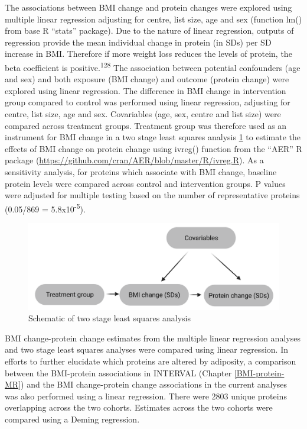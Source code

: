 \documentclass[11pt,twoside]{bristolthesis}
\begin{document}
The associations between BMI change and protein changes were explored using multiple linear regression adjusting for centre, list size, age and sex (function lm() from base R ``stats'' package). Due to the nature of linear regression, outputs of regression provide the mean individual change in protein (in SDs) per SD increase in BMI. Therefore if more weight loss reduces the levels of protein, the beta coefficient is positive.\textsuperscript{128} The association between potential confounders (age and sex) and both exposure (BMI change) and outcome (protein change) were explored using linear regression. The difference in BMI change in intervention group compared to control was performed using linear regression, adjusting for centre, list size, age and sex. Covariables (age, sex, centre and list size) were compared across treatment groups. Treatment group was therefore used as an instrument for BMI change in a two stage least squares analysis \ref{fig:direct-tsls} to estimate the effects of BMI change on protein change using ivreg() function from the ``AER'' R package (\url{https://github.com/cran/AER/blob/master/R/ivreg.R}). As a sensitivity analysis, for proteins which associate with BMI change, baseline protein levels were compared across control and intervention groups. P values were adjusted for multiple testing based on the number of representative proteins (0.05/869 = 5.8x10\textsuperscript{-5}).



\begin{figure}
\includegraphics{figure/DiRECT/DiRECT_analysis} \caption[Schematic of two stage least squares analysis]{Schematic of two stage least squares analysis}\label{fig:direct-tsls}
\end{figure}
BMI change-protein change estimates from the multiple linear regression analyses and two stage least squares analyses were compared using linear regression. In efforts to further elucidate which proteins are altered by adiposity, a comparison between the BMI-protein associations in INTERVAL (Chapter \ref{BMI-protein-MR}) and the BMI change-protein change associations in the current analyses was also performed using a linear regression. There were 2803 unique proteins overlapping across the two cohorts. Estimates across the two cohorts were compared using a Deming regression.
\end{document}
